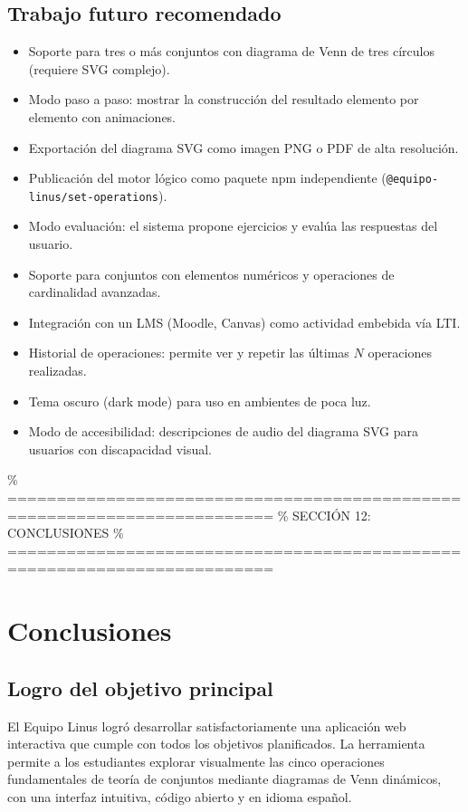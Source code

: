 \documentclass[11pt,a4paper]{article}
\begin{document}
\subsection{Trabajo futuro recomendado}
\begin{itemize}[noitemsep]
    \item Soporte para tres o más conjuntos con diagrama de Venn de tres círculos (requiere SVG complejo).
    \item Modo paso a paso: mostrar la construcción del resultado elemento por elemento con animaciones.
    \item Exportación del diagrama SVG como imagen PNG o PDF de alta resolución.
    \item Publicación del motor lógico como paquete npm independiente (\texttt{@equipo-linus/set-operations}).
    \item Modo evaluación: el sistema propone ejercicios y evalúa las respuestas del usuario.
    \item Soporte para conjuntos con elementos numéricos y operaciones de cardinalidad avanzadas.
    \item Integración con un LMS (Moodle, Canvas) como actividad embebida vía LTI.
    \item Historial de operaciones: permite ver y repetir las últimas $N$ operaciones realizadas.
    \item Tema oscuro (dark mode) para uso en ambientes de poca luz.
    \item Modo de accesibilidad: descripciones de audio del diagrama SVG para usuarios con discapacidad visual.
\end{itemize}

\newpage

\% =========================================================================
\% SECCIÓN 12: CONCLUSIONES
\% =========================================================================
\section{Conclusiones}

\subsection{Logro del objetivo principal}
El Equipo Linus logró desarrollar satisfactoriamente una aplicación web interactiva que cumple con todos los objetivos planificados. La herramienta permite a los estudiantes explorar visualmente las cinco operaciones fundamentales de teoría de conjuntos mediante diagramas de Venn dinámicos, con una interfaz intuitiva, código abierto y en idioma español.
\end{document}
